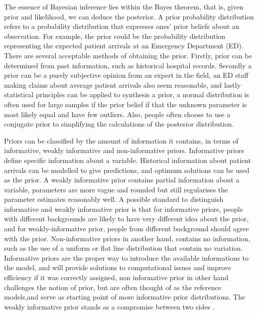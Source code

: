 The essence of Bayesian inference lies within the Bayes theorem, that is, given prior and likelihood, we can deduce the posterior. A prior probability distribution refers to a probability distribution that expresses ones' prior beliefs about an observation. For example, the prior could be the probability distribution representing the expected patient arrivals at an Emergency Department (ED). There are several acceptable methods of obtaining the prior. Firstly, prior can be determined from past information, such as historical hospital records. Secondly a prior can be a purely subjective opinion from an expert in the field, an ED staff making claims about average patient arrivals also seem reasonable, and lastly statistical principles can be applied to synthesis a prior, a normal distribution is often used for large samples if the prior belief if that the unknown parameter is most likely equal and have few outliers. Also, people often choose to use a conjugate prior to simplifying the calculations of the posterior distribution.

\newpara

Priors can be classified by the amount of information it contains, in terms of informative, weakly informative and non-informative priors. Informative priors define specific information about a variable. Historical information about patient arrivals can be modelled to give predictions, and optimum solutions can be used as the prior. A weakly informative prior contains partial information about a variable, parameters are more vague and rounded but still regularises the parameter estimates reasonably well. A possible standard to distinguish informative and weakly informative prior is that for informative priors, people with different backgrounds are likely to have very different idea about the prior, and for weakly-informative prior, people from different background should agree with the prior. Non-informative priors in another hand, contains no information, such as the use of a uniform or flat line distribution that contain no variation. Informative priors are the proper way to introduce the available informations to the model, and will provide solutions to computational issues and improve efficiency if it was correctly assigned, non informative prior in other hand challenges the notion of prior, but are often thought of as the reference models,and serve as starting point of more informative prior distributions. The weakly informative prior stands as a compromise between two sides \citep{carlin2008bayesian, golchi2016informative}.

